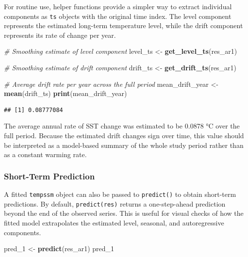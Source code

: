 \documentclass[
]{article}
\newenvironment{Shaded}{\begin{snugshade}}{\end{snugshade}}
\newcommand{\CommentTok}[1]{\textcolor[rgb]{0.56,0.35,0.01}{\textit{#1}}}
\newcommand{\FunctionTok}[1]{\textcolor[rgb]{0.13,0.29,0.53}{\textbf{#1}}}
\newcommand{\NormalTok}[1]{#1}
\newcommand{\OtherTok}[1]{\textcolor[rgb]{0.56,0.35,0.01}{#1}}
\begin{document}
For routine use, helper functions provide a simpler way to extract
individual components as \texttt{ts} objects with the original time
index. The level component represents the estimated long-term
temperature level, while the drift component represents its rate of
change per year.

\begin{Shaded}
\begin{Highlighting}[]
\CommentTok{\# Smoothing estimate of level component}
\NormalTok{level\_ts }\OtherTok{\textless{}{-}} \FunctionTok{get\_level\_ts}\NormalTok{(res\_ar1)}

\CommentTok{\# Smoothing estimate of drift component}
\NormalTok{drift\_ts }\OtherTok{\textless{}{-}} \FunctionTok{get\_drift\_ts}\NormalTok{(res\_ar1)}

\CommentTok{\# Average drift rate per year across the full period}
\NormalTok{mean\_drift\_year }\OtherTok{\textless{}{-}} \FunctionTok{mean}\NormalTok{(drift\_ts) }
\FunctionTok{print}\NormalTok{(mean\_drift\_year)}
\end{Highlighting}
\end{Shaded}

\begin{verbatim}
## [1] 0.08777084
\end{verbatim}

The average annual rate of SST change was estimated to be 0.0878 °C over
the full period. Because the estimated drift changes sign over time,
this value should be interpreted as a model-based summary of the whole
study period rather than as a constant warming rate.

\subsubsection{Short-Term Prediction}\label{short-term-prediction}

A fitted \texttt{tempssm} object can also be passed to
\texttt{predict()} to obtain short-term predictions. By default,
\texttt{predict(res)} returns a one-step-ahead prediction beyond the end
of the observed series. This is useful for visual checks of how the
fitted model extrapolates the estimated level, seasonal, and
autoregressive components.

\begin{Shaded}
\begin{Highlighting}[]
\NormalTok{pred\_1 }\OtherTok{\textless{}{-}} \FunctionTok{predict}\NormalTok{(res\_ar1)}
\NormalTok{pred\_1}
\end{Highlighting}
\end{Shaded}
\end{document}

